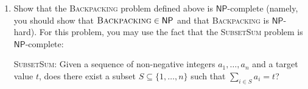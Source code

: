 \documentclass[10pt]{article}
\begin{document}
\begin{enumerate}
  \item Show that the \textsc{Backpacking} problem defined above is $\mathsf{NP}$-complete (namely, you should
  show that $\textsc{Backpacking} \in \mathsf{NP}$ and that \textsc{Backpacking} is $\mathsf{NP}$-hard). For this
  problem, you may use the fact that the \textsc{SubsetSum} problem is $\mathsf{NP}$-complete:

  \begin{minipage}[t]{\linewidth}
  \begin{framed}
    \textsc{SubsetSum}: Given a sequence of non-negative integers $a_1, \ldots, a_n$
    and a target value $t$, does there exist
    a subset $S \subseteq \{ 1, \ldots, n \}$ such that $\sum_{i \in S} a_i = t$?
  \end{framed}
  \end{minipage}
  

\end{enumerate}
\end{document}
